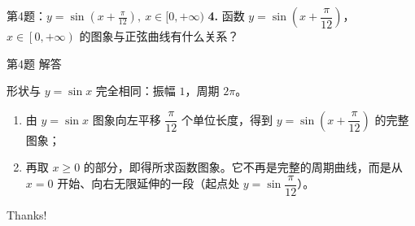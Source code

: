 \documentclass[10pt,aspectratio=169,serif]{beamer}
\begin{document}
\begin{frame}[t]{第4题：$y=\sin(x+\frac{\pi}{12}),\ x\in[0,+\infty)$}
\textbf{4.} 函数 $y=\sin\!\left(x+\dfrac{\pi}{12}\right)$，$x\in\left[0,+\infty\right)$ 的图象与正弦曲线有什么关系？
\end{frame}

\begin{frame}[t]{第4题 解答}
\begin{tcolorbox}[colback=orange!10,colframe=orange,title=\textbf{解}]
形状与 $y=\sin x$ 完全相同：振幅 $1$，周期 $2\pi$。
\begin{enumerate}
  \item 由 $y=\sin x$ 图象向左平移 $\dfrac{\pi}{12}$ 个单位长度，得到 $y=\sin\!\left(x+\dfrac{\pi}{12}\right)$ 的完整图象；
  \item 再取 $x\ge 0$ 的部分，即得所求函数图象。它不再是完整的周期曲线，而是从 $x=0$ 开始、向右无限延伸的一段（起点处 $y=\sin\dfrac{\pi}{12}$）。
\end{enumerate}
\end{tcolorbox}
\end{frame}

\begin{frame}[c]
  \begin{center}
    {\Huge\calligra Thanks!}
  \end{center}
\end{frame}
\end{document}
